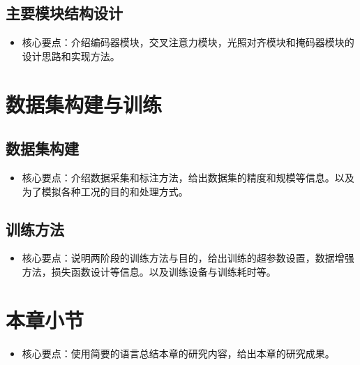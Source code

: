 \documentclass{Diploma}
\begin{document}
\subsection{主要模块结构设计}
\begin{itemize}
  \item 核心要点：介绍编码器模块，交叉注意力模块，光照对齐模块和掩码器模块的设计思路和实现方法。
\end{itemize}
\section{数据集构建与训练}
\subsection{数据集构建}
\begin{itemize}
  \item 核心要点：介绍数据采集和标注方法，给出数据集的精度和规模等信息。以及为了模拟各种工况的目的和处理方式。
\end{itemize}
\subsection{训练方法}
\begin{itemize}
  \item 核心要点：说明两阶段的训练方法与目的，给出训练的超参数设置，数据增强方法，损失函数设计等信息。以及训练设备与训练耗时等。
\end{itemize}
\section{本章小节}
\begin{itemize}
  \item 核心要点：使用简要的语言总结本章的研究内容，给出本章的研究成果。
\end{itemize}
\end{document}
